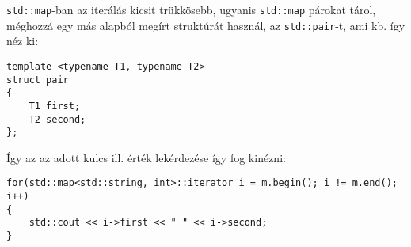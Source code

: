 \documentclass[a4paper,11.5pt]{article}
\begin{document}
	\texttt{std::map}-ban az iterálás kicsit trükkösebb, ugyanis \texttt{std::map} párokat tárol, méghozzá egy más alapból megírt struktúrát használ, az \texttt{std::pair}-t, ami kb. így néz ki:
	\begin{lstlisting}
template <typename T1, typename T2>
struct pair
{
	T1 first;
	T2 second;
};
	\end{lstlisting}
	Így az az adott kulcs ill. érték lekérdezése így fog kinézni:
	\begin{lstlisting}
for(std::map<std::string, int>::iterator i = m.begin(); i != m.end(); i++)
{
	std::cout << i->first << " " << i->second;
}
	\end{lstlisting}
		
\end{document}
